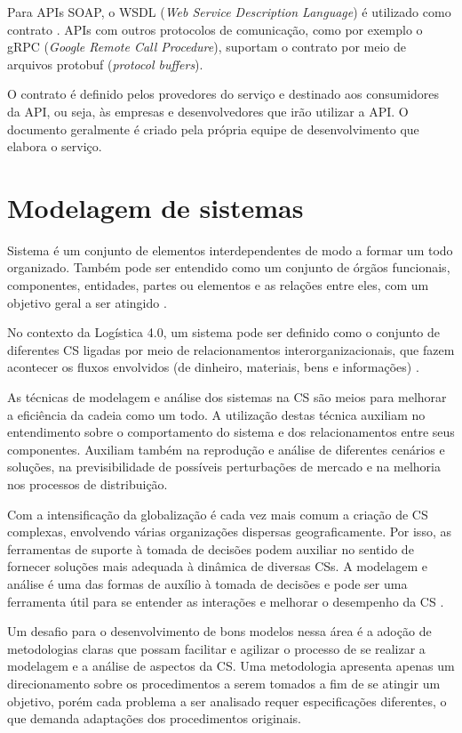 Para APIs SOAP, o WSDL (\textit{Web Service Description Language}) é utilizado como contrato \cite{booth2004webservice}. APIs com outros protocolos de comunicação, como por exemplo o gRPC (\textit{Google Remote Call Procedure}), suportam o contrato por meio de arquivos protobuf (\textit{protocol buffers}).

O contrato é definido pelos provedores do serviço e destinado aos consumidores da API, ou seja, às empresas e desenvolvedores que irão utilizar a API. O documento geralmente é criado pela própria equipe de desenvolvimento que elabora o serviço.

\section{Modelagem de sistemas}
\label{sec:modelagem-de-sistemas}

Sistema é um conjunto de elementos interdependentes de modo a formar um todo organizado. Também pode ser entendido como um conjunto de órgãos funcionais, componentes, entidades, partes ou elementos e as relações entre eles, com um objetivo geral a ser atingido \cite{mulbert2005sistemas}.

No contexto da Logística 4.0, um sistema pode ser definido como o conjunto de diferentes CS ligadas por meio de relacionamentos interorganizacionais, que fazem acontecer os fluxos envolvidos (de dinheiro, materiais, bens e informações) \cite{oliveira2016supplychain}.

As técnicas de modelagem e análise dos sistemas na CS são meios para melhorar a eficiência da cadeia como um todo. A utilização destas técnica auxiliam no entendimento sobre o comportamento do sistema e dos relacionamentos entre seus componentes. Auxiliam também na reprodução e análise de diferentes cenários e soluções, na previsibilidade de possíveis perturbações de mercado e na melhoria nos processos de distribuição.

Com a intensificação da globalização é cada vez mais comum a criação de CS complexas, envolvendo várias organizações dispersas geograficamente. Por isso, as ferramentas de suporte à tomada de decisões podem auxiliar no sentido de fornecer soluções mais adequada à dinâmica de diversas CSs. A modelagem e análise é uma das formas de auxílio à tomada de decisões e pode ser uma ferramenta útil para se entender as interações e melhorar o desempenho da CS \cite{oliveira2016supplychain}.

Um desafio para o desenvolvimento de bons modelos nessa área é a adoção de metodologias claras que possam facilitar e agilizar o processo de se realizar a modelagem e a análise de aspectos da CS. Uma metodologia apresenta apenas um direcionamento sobre os procedimentos a serem tomados a fim de se atingir um objetivo, porém cada problema a ser analisado requer especificações diferentes, o que demanda adaptações dos procedimentos originais.

